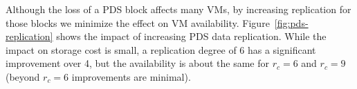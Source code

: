 Although the loss of a PDS block affects many VMs,
by increasing replication for those blocks we minimize the effect on VM availability.
%
Figure~\ref{fig:pds-replication} shows
the impact of increasing PDS data replication. 
While the impact on storage cost is small, 
a replication degree of 6  has a significant improvement over 4, but the availability is about
the same for $r_c=6$ and $r_c=9$ (beyond $r_c=6$ improvements are minimal).
 

